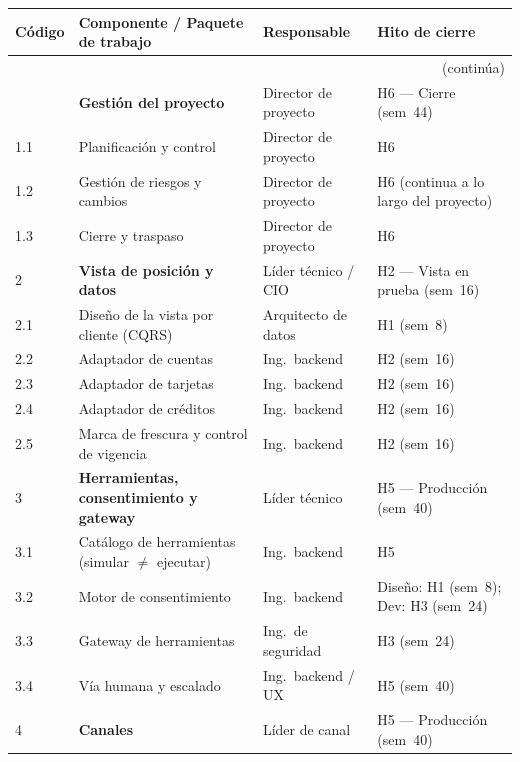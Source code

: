 \documentclass[11pt]{article}
\begin{document}
\begin{longtable}{@{}p{1.0cm} p{5.8cm} p{3.1cm} p{3.9cm}@{}}
\toprule
\textbf{Código} & \textbf{Componente / Paquete de trabajo} & \textbf{Responsable} & \textbf{Hito de cierre} \\
\midrule
\endhead
\midrule\multicolumn{4}{r}{\small(continúa)}\\
\endfoot
\bottomrule
\endlastfoot
1   & \textbf{Gestión del proyecto}               & Director de proyecto      & H6 — Cierre (sem~44) \\
1.1 & \quad Planificación y control               & Director de proyecto      & H6 \\
1.2 & \quad Gestión de riesgos y cambios          & Director de proyecto      & H6 (continua a lo largo del proyecto) \\
1.3 & \quad Cierre y traspaso                     & Director de proyecto      & H6 \\[0.4em]
\midrule
2   & \textbf{Vista de posición y datos}          & Líder técnico / CIO       & H2 — Vista en prueba (sem~16) \\
2.1 & \quad Diseño de la vista por cliente (CQRS) & Arquitecto de datos       & H1 (sem~8) \\
2.2 & \quad Adaptador de cuentas                  & Ing.\ backend             & H2 (sem~16) \\
2.3 & \quad Adaptador de tarjetas                 & Ing.\ backend             & H2 (sem~16) \\
2.4 & \quad Adaptador de créditos                 & Ing.\ backend             & H2 (sem~16) \\
2.5 & \quad Marca de frescura y control de vigencia & Ing.\ backend           & H2 (sem~16) \\[0.4em]
\midrule
3   & \textbf{Herramientas, consentimiento y gateway} & Líder técnico        & H5 — Producción (sem~40) \\
3.1 & \quad Catálogo de herramientas (simular $\neq$ ejecutar) & Ing.\ backend & H5 \\
3.2 & \quad Motor de consentimiento               & Ing.\ backend             & Diseño: H1 (sem~8); Dev: H3 (sem~24) \\
3.3 & \quad Gateway de herramientas               & Ing.\ de seguridad        & H3 (sem~24) \\
3.4 & \quad Vía humana y escalado                 & Ing.\ backend / UX        & H5 (sem~40) \\[0.4em]
\midrule
4   & \textbf{Canales}                            & Líder de canal            & H5 — Producción (sem~40) \\

\end{longtable}
\end{document}
